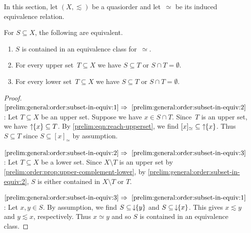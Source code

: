 In this section, let $(X, \lesssim)$ be a quasiorder and let~$\simeq$
be its induced equivalence relation.

\begin{proposition} \label{prelim:general:order:subset-in-equiv}
	For $S \subseteq X$, the following are equivalent.
	\begin{enumerate}
		\item \label{prelim:general:order:subset-in-equiv:1} $S$ is contained in an equivalence class for~$\simeq$.
		
		\item \label{prelim:general:order:subset-in-equiv:2} For every upper set~$T \subseteq X$
		we have $S \subseteq T$
		or $S \cap T = \emptyset$. 
		
		\item \label{prelim:general:order:subset-in-equiv:3} For every lower set~$T \subseteq X$
		we have $S \subseteq T$
		or $S \cap T = \emptyset$. 		
	\end{enumerate}
\end{proposition}
\begin{proof}
$\ref{prelim:general:order:subset-in-equiv:1} \Rightarrow~\ref{prelim:general:order:subset-in-equiv:2}$: Let $T \subseteq X$ be an upper set.
 Suppose we have $x \in S \cap T$.
 Since~$T$ is an upper set, we have $\mbox{\ensuremath{\displaystyle \uparrow \!\!\{x\}}} \subseteq T$.
 By \cref{prelim:eqn:reach-upperset},
 we find $[x]_{\simeq} \subseteq \mbox{\ensuremath{\displaystyle \uparrow \!\!\{x\}}}$.
 Thus $S\subseteq T$ since $S \subseteq [x]_{\simeq}$ by assumption.
 
 	
$\ref{prelim:general:order:subset-in-equiv:2} \Rightarrow~\ref{prelim:general:order:subset-in-equiv:3}$: Let $T \subseteq X$ be a lower set. Since $X \setminus T$ is an upper set by \cref{prelim:order:prop:upper-complement-lower}, by \cref{prelim:general:order:subset-in-equiv:2}, $S$ is either contained in $X \setminus T$ or $T$.
 
$\ref{prelim:general:order:subset-in-equiv:3} \Rightarrow~\ref{prelim:general:order:subset-in-equiv:1}$: Let $x, y \in S$. 
 By assumption, we find $S \subseteq \,\downarrow \!\!\{y\}$
 and $S \subseteq \,\downarrow \!\!\{x\}$.
 This gives $x \lesssim y$ and $y \lesssim x$, respectively.
 Thus $x \simeq y$ and so $S$ is contained in an equivalence class. 
\end{proof}

